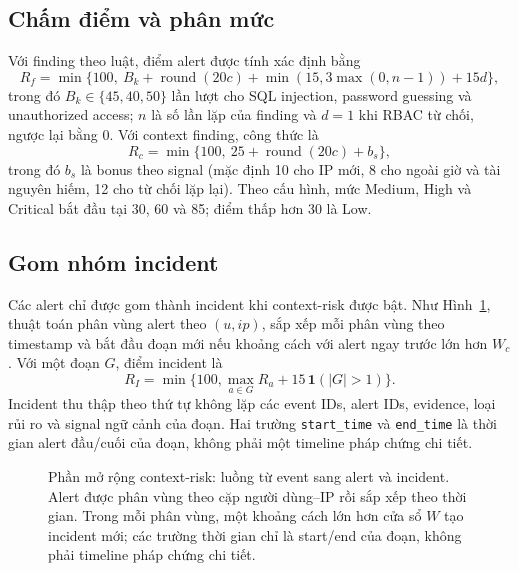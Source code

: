 \subsection{Chấm điểm và phân mức}
\label{subsec:risk-scoring}

Với finding theo luật, điểm alert được tính xác định bằng
\begin{equation}
  R_f=\min\{100,\ B_k+\operatorname{round}(20c)
  +\min(15,3\max(0,n-1))+15d\},
  \label{eq:rule-score}
\end{equation}
trong đó $B_k\in\{45,40,50\}$ lần lượt cho SQL injection, password guessing
và unauthorized access; $n$ là số lần lặp của finding và $d=1$ khi RBAC từ
chối, ngược lại bằng 0. Với context finding, công thức là
\begin{equation}
  R_c=\min\{100,\ 25+\operatorname{round}(20c)+b_s\},
  \label{eq:context-score}
\end{equation}
trong đó $b_s$ là bonus theo signal (mặc định 10 cho IP mới, 8 cho ngoài giờ và
tài nguyên hiếm, 12 cho từ chối lặp lại). Theo cấu hình, mức Medium, High và
Critical bắt đầu tại 30, 60 và 85; điểm thấp hơn 30 là Low.

\subsection{Gom nhóm incident}
\label{subsec:incident-grouping}

Các alert chỉ được gom thành incident khi context-risk được bật. Như
Hình~\ref{fig:event-alert-incident}, thuật toán phân vùng alert theo $(u,ip)$,
sắp xếp mỗi phân vùng theo timestamp và bắt đầu đoạn mới nếu khoảng cách với
alert ngay trước lớn hơn $W_c$. Với một đoạn $G$, điểm incident là
\begin{equation}
  R_I=\min\{100,\max_{a\in G}R_a + 15\,\mathbf{1}(|G|>1)\}.
  \label{eq:incident-score}
\end{equation}
Incident thu thập theo thứ tự không lặp các event IDs, alert IDs, evidence,
loại rủi ro và signal ngữ cảnh của đoạn. Hai trường \texttt{start\_time} và
\texttt{end\_time} là thời gian alert đầu/cuối của đoạn, không phải một timeline
pháp chứng chi tiết.

\begin{figure}[t]
  \centering
  \resizebox{0.98\linewidth}{!}{}
  \caption{Phần mở rộng context-risk: luồng từ event sang alert và incident.
  Alert được phân vùng theo cặp người dùng--IP rồi sắp xếp theo thời gian. Trong
  mỗi phân vùng, một khoảng cách lớn hơn cửa sổ $W$ tạo incident mới; các trường
  thời gian chỉ là start/end của đoạn, không phải timeline pháp chứng chi tiết.}
  \label{fig:event-alert-incident}
\end{figure}
